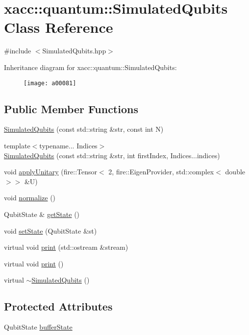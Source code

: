 \hypertarget{a00081}{}\section{xacc\+:\+:quantum\+:\+:Simulated\+Qubits Class Reference}
\label{a00081}


{\ttfamily \#include $<$Simulated\+Qubits.\+hpp$>$}

Inheritance diagram for xacc\+:\+:quantum\+:\+:Simulated\+Qubits\+:\begin{figure}[H]
\begin{center}
\leavevmode
\texttt{[image: a00081]}
\end{center}
\end{figure}
\subsection*{Public Member Functions}
\begin{DoxyCompactItemize}
\item 
\hyperlink{a00081_abb0419229628210a1c187b76be6edc30}{Simulated\+Qubits} (const std\+::string \&str, const int N)
\item 
{\footnotesize template$<$typename... Indices$>$ }\\\hyperlink{a00081_ae11d09c17316adb09b93cc866969dba8}{Simulated\+Qubits} (const std\+::string \&str, int first\+Index, Indices...\+indices)
\item 
void \hyperlink{a00081_a3f4518d0135101141bf92d7e31f4fddc}{apply\+Unitary} (fire\+::\+Tensor$<$ 2, fire\+::\+Eigen\+Provider, std\+::complex$<$ double $>$$>$ \&U)
\item 
void \hyperlink{a00081_a09ee499769bb1eedaf08d6b5c29f9791}{normalize} ()
\item 
Qubit\+State \& \hyperlink{a00081_a405577717ca200ed9e524c04209e0216}{get\+State} ()
\item 
void \hyperlink{a00081_a8cd74c239c1fcecb3d03d6989732d5fe}{set\+State} (Qubit\+State \&st)
\item 
virtual void \hyperlink{a00081_a9252d30be0563f36bf1ff839c7104cd7}{print} (std\+::ostream \&stream)
\item 
virtual void \hyperlink{a00081_a32922bd2ccc64bba601c07a3c136cc3d}{print} ()
\item 
virtual \hyperlink{a00081_aebf6f30a6d8c84971091d87908680e7e}{$\sim$\+Simulated\+Qubits} ()
\end{DoxyCompactItemize}
\subsection*{Protected Attributes}
\begin{DoxyCompactItemize}
\item 
Qubit\+State \hyperlink{a00081_a630bea50ee06fd59f74450f01f95e489}{buffer\+State}
\end{DoxyCompactItemize}


